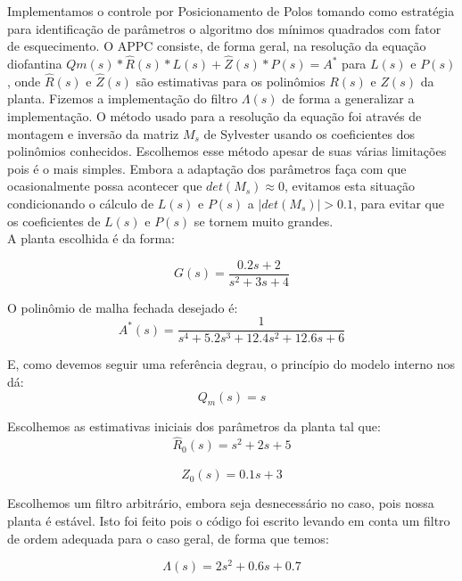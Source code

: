 \documentclass[11pt]{report}
\begin{document}
Implementamos o controle por Posicionamento de Polos tomando como estratégia para identificação de parâmetros o algoritmo dos mínimos quadrados com fator de esquecimento. O APPC consiste, de forma geral, na resolução da equação diofantina $Qm(s)*\hat{R}(s)*L(s) + \hat{Z}(s)*P(s) = A^*$ para $L(s)$ e $P(s)$, onde $\hat{R}(s)$ e $\hat{Z}(s)$ são estimativas para os polinômios $R(s)$ e $Z(s)$ da planta. Fizemos a implementação do filtro $\Lambda(s)$ de forma a generalizar a implementação. O método usado para a resolução da equação foi através de montagem e inversão da matriz $M_s$ de Sylvester usando os coeficientes dos polinômios conhecidos. Escolhemos esse método apesar de suas várias limitações pois é o mais simples. Embora a adaptação dos parâmetros faça com que ocasionalmente possa acontecer que $det(M_s)\approx0$, evitamos esta situação condicionando o cálculo de $L(s)$ e $P(s)$ a $|det(M_s)|>0.1$, para evitar que os coeficientes de $L(s)$ e $P(s)$ se tornem muito grandes.\\

A planta escolhida é da forma:

\begin{equation}
G(s) = \frac{0.2s + 2}{s^2+3s+4}
\end{equation}

O polinômio de malha fechada desejado é:
\begin{equation}
A^*(s) = \frac{1}{s^4+5.2s^3+12.4s^2+12.6s+6}
\end{equation}

E, como devemos seguir uma referência degrau, o princípio do modelo interno nos dá:
\begin{equation}
Q_m(s) = s 
\end{equation}

Escolhemos as estimativas iniciais dos parâmetros da planta tal que:
\begin{equation}
\hat{R}_0(s) = s^2+2s+5
\end{equation}

\begin{equation}
\hat{Z}_0(s) = 0.1s+3
\end{equation}

Escolhemos um filtro arbitrário, embora seja desnecessário no caso, pois nossa planta é estável. Isto foi feito pois o código foi escrito levando em conta um filtro de ordem adequada para o caso geral, de forma que temos:

\begin{equation}
\Lambda(s) = 2s^2+0.6s+0.7
\end{equation}
\end{document}

